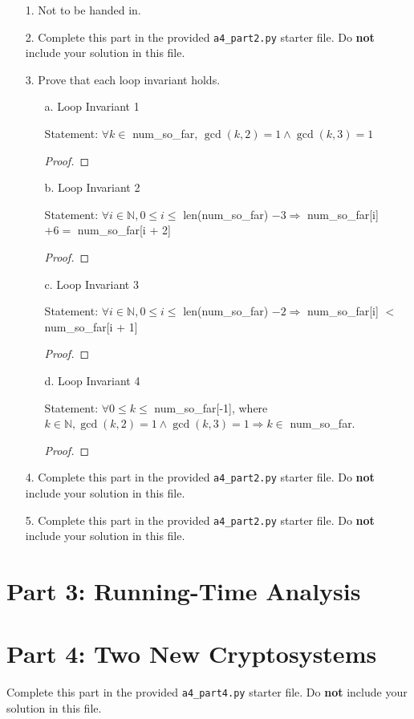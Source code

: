 \documentclass[fontsize=11pt]{article}
\newcommand{\N}{\mathbb{N}}
\begin{document}
\begin{enumerate}

\item[1.]
Not to be handed in.

\item[2.]
Complete this part in the provided \texttt{a4\_part2.py} starter file.
Do \textbf{not} include your solution in this file.

\item[3.]
Prove that each loop invariant holds.

\begin{enumerate}
\item[a.] Loop Invariant 1

Statement: $\forall k \in$ num\_so\_far, $\gcd (k, 2) = 1 \land \gcd(k, 3) = 1$
\begin{proof}
\end{proof}

\item[b.] Loop Invariant 2

Statement: $\forall i \in \N, 0 \leq i \leq$ len(num\_so\_far) $- 3 \Rightarrow$ num\_so\_far[i] $+ 6 = $ num\_so\_far[i + 2]
\begin{proof}
\end{proof}

\item[c.] Loop Invariant 3

Statement: $\forall i \in \N, 0 \leq i \leq$ len(num\_so\_far) $- 2 \Rightarrow$ num\_so\_far[i] $<$ num\_so\_far[i + 1]
\begin{proof}
\end{proof}

\item[d.] Loop Invariant 4

Statement: $\forall 0 \leq k \leq$ num\_so\_far[-1], where $k \in \N, \gcd(k, 2) = 1 \land \gcd(k, 3) = 1 \Rightarrow k \in$ num\_so\_far.
\begin{proof}
\end{proof}
\end{enumerate}

\item[4.]
Complete this part in the provided \texttt{a4\_part2.py} starter file.
Do \textbf{not} include your solution in this file.

\item[5.]
Complete this part in the provided \texttt{a4\_part2.py} starter file.
Do \textbf{not} include your solution in this file.
\end{enumerate}

\newpage

\section*{Part 3: Running-Time Analysis}


\section*{Part 4: Two New Cryptosystems}

Complete this part in the provided \texttt{a4\_part4.py} starter file.
Do \textbf{not} include your solution in this file.
\end{document}
